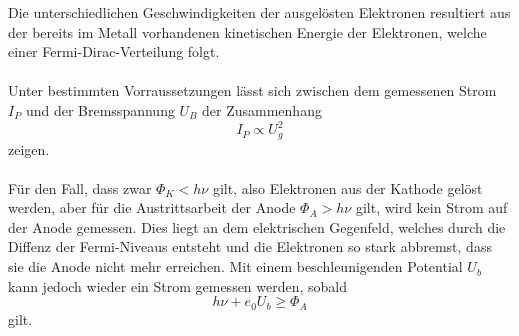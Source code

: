 \noindent
Die unterschiedlichen Geschwindigkeiten der ausgelösten Elektronen resultiert aus der bereits im Metall vorhandenen kinetischen Energie der 
Elektronen, welche einer Fermi-Dirac-Verteilung folgt. 
\\
\\
\noindent
Unter bestimmten Vorraussetzungen lässt sich zwischen dem gemessenen Strom $I_{P}$ und der Bremsspannung $U_B$ der Zusammenhang 
\begin{equation*}
    I_{P}\propto U^2_g
\end{equation*}
zeigen. 
\\
\\\noindent
Für den Fall, dass zwar $\Phi_K<h\nu$ gilt, also Elektronen aus der Kathode gelöst werden, aber für die Austrittsarbeit der Anode 
$\Phi_A>h\nu$ gilt, wird kein Strom auf der Anode gemessen. Dies liegt an dem elektrischen Gegenfeld, welches durch die Diffenz der 
Fermi-Niveaus entsteht und die Elektronen so stark abbremst, dass sie die Anode nicht mehr erreichen. 
Mit einem beschleunigenden Potential $U_b$ kann jedoch wieder ein Strom gemessen werden, sobald 
\begin{equation*}
    h\nu+e_0U_{b}\geq \Phi_A
\end{equation*}
gilt.